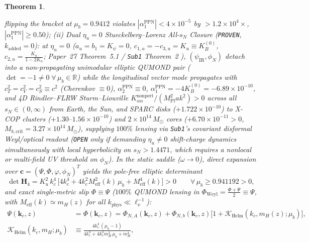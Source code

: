 \documentclass[11pt,a4paper]{article}
\newtheorem{theorem}{Theorem}
\begin{document}
\begin{theorem}
\begin{enumerate}
flipping the bracket at $\mu_b = 0.9412$ violates $|\alpha_1^{\mathrm{PPN}}| < 4\times 10^{-5}$ by $>1.2\times 10^4\times$, $|\alpha_1^{\mathrm{PPN}}| \ge 0.50$); (ii) \emph{Dual $\eta_u = 0$ Stueckelberg--Lorenz All-$s_N$ Closure ({\upshape\texttt{PROVEN}}, $k_{\mathrm{added}} = 0$):} at $\eta_u = 0$ ($a_u = b_1 = K_\psi = 0$, $c_{1,u} = -c_{3,u} = K_u \equiv K_B^{(0)}$, $c_{2,u} = \frac{K_u}{1 - 2K_u}$; Paper~27 Theorem~5.1 / {\upshape\texttt{Sub1}} Theorem~2 \cite{Olcsak2026Sub1,Olcsak2026Paper27}), $(\psi_{\mathrm{IR}},\phi_N)$ detach into a non-propagating unimodular elliptic QUMOND pair ($\det = -1 \neq 0\;\forall\,\mu_b \in \mathbb{R}$) while the longitudinal vector mode propagates with $c_T^2 = c_V^2 = c_S^2 \equiv c^2$ (Cherenkov $\equiv 0$), $\alpha_2^{\mathrm{PPN}} \equiv 0$, $\alpha_1^{\mathrm{PPN}} = -4K_B^{(0)} = -6.89\times 10^{-10}$, and 4D Rindler--FLRW Sturm--Liouville $K_{\alpha\alpha}^{\mathrm{nonpert}}/(M_{\mathrm{Pl}}^2 a k^2) > 0$ across \emph{all} $s_N \in (0,\infty)$ from Earth, the Sun, and SPARC disks ($+1.722\times 10^{-10}$) to X-COP clusters ($+1.30\text{--}1.56\times 10^{-10}$) and $2\times 10^{14}\,M_\odot$ cores ($+6.70\times 10^{-11} > 0$, $M_{b,\mathrm{crit}} = 3.27\times 10^{14}\,M_\odot$), supplying $100\%$ lensing via {\upshape\texttt{Sub1}}'s covariant disformal Weyl/optical readout ({\upshape\texttt{OPEN}} only if demanding $\eta_u \neq 0$ shift-charge dynamics simultaneously with local hyperbolicity on $s_N > 1.4471$, which requires a nonlocal or multi-field UV threshold on $\phi_N$). In the static saddle ($\omega \to 0$), direct expansion over $\mathbf{c} = (\Psi, \Phi, \varphi, \phi_N)^T$ yields the pole-free elliptic determinant
  \begin{equation}
    \det\mathbf{H}_4 = K_u^2\,k_c^4\,\bigl[4 k_c^4 + 4 k_c^2 M_{\mathrm{eff}}^2(k)\,\mu_b + M_{\mathrm{eff}}^4(k)\bigr] > 0 \qquad \forall\,\mu_b \ge 0.941192 > 0,
    \label{eq:h4-covariant}
  \end{equation}
  and exact single-metric slip $\Phi \equiv \Psi$ ($100\%$ QUMOND lensing in $\Phi_{\mathrm{Weyl}} = \frac{\Phi+\Psi}{2} \equiv \Psi$, with $M_{\mathrm{eff}}(k) \simeq m_H(z)$ for all $k_{\mathrm{phys}} \ll \ell_\nu^{-1}$):
  \begin{equation}
  \begin{aligned}
    \Psi(\mathbf{k}_c, z) &= \Phi(\mathbf{k}_c, z) = \Phi_{N,A}(\mathbf{k}_c, z) + \Phi_{N,b}(\mathbf{k}_c, z)\bigl[1 + \mathcal{K}_{\mathrm{Helm}}(k_c, m_H(z); \mu_b)\bigr], \\
    \mathcal{K}_{\mathrm{Helm}}(k_c, m_H; \mu_b) &\equiv \frac{4 k_c^4\,(\mu_b - 1)}{4 k_c^4 + 4 k_c^2 m_H^2\,\mu_b + m_H^4}, \\

\end{aligned}
\end{equation}
\end{enumerate}
\end{theorem}
\end{document}
